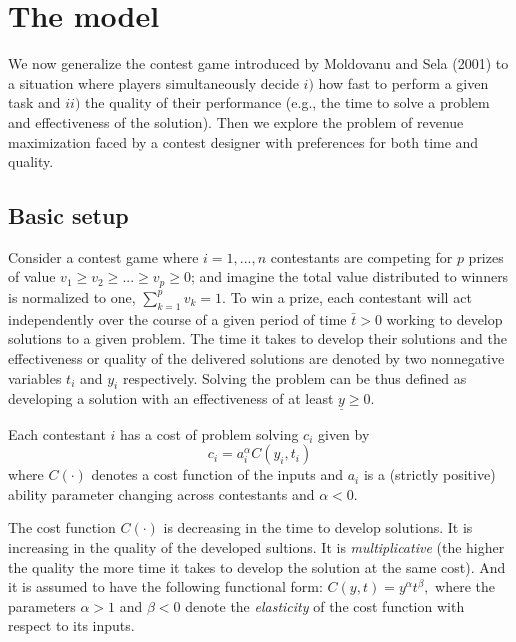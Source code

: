 \documentclass[10pt, titlepage]{article}
\newcommand\deadline{\bar{t}}
\newcommand\target{\underline{y}}
\begin{document}
\newcommand\competition{c}
\newcommand\ability{a}
\newcommand\performance{y}
\newcommand\timing{t}
\newcommand\Timing{T}
\newcommand\Performance{Y}

\section{The model}\label{the-model}

We now generalize the contest game introduced by Moldovanu and Sela
(2001) to a situation where players simultaneously decide \(i)\) how
fast to perform a given task and \(ii)\) the quality of their
performance (e.g., the time to solve a problem and effectiveness of the
solution). Then we explore the problem of revenue maximization faced by
a contest designer with preferences for both time and quality.

\subsection{Basic setup}\label{basic-setup}

Consider a contest game where \(i=1,..., n\) contestants are competing
for \(p\) prizes of value \(v_1\geq v_2\geq ...\geq v_p\geq0\); and
imagine the total value distributed to winners is normalized to one,
\(\sum_{k=1}^p v_k =1\). To win a prize, each contestant will act
independently over the course of a given period of time \(\deadline>0\)
working to develop solutions to a given problem. The time it takes to
develop their solutions and the effectiveness or quality of the
delivered solutions are denoted by two nonnegative variables
\(\timing_i\) and \(\performance_i\) respectively. Solving the problem
can be thus defined as developing a solution with an effectiveness of at
least \(\target\geq0\).

Each contestant \(i\) has a cost of problem solving \(c_i\) given by \[
    c_i = \ability_i^\alpha C(\performance_i, \timing_i)
\] where \(C(\cdot)\) denotes a cost function of the inputs and \(a_i\)
is a (strictly positive) ability parameter changing across contestants
and \(\alpha<0\).

The cost function \(C(\cdot)\) is decreasing in the time to develop
solutions. It is increasing in the quality of the developed sultions. It
is \emph{multiplicative} (the higher the quality the more time it takes
to develop the solution at the same cost). And it is assumed to have the
following functional form:
\(C(\performance, \timing) = \performance^\alpha \timing^\beta,\) where
the parameters \(\alpha>1\) and \(\beta<0\) denote the \emph{elasticity}
of the cost function with respect to its inputs.
\end{document}
